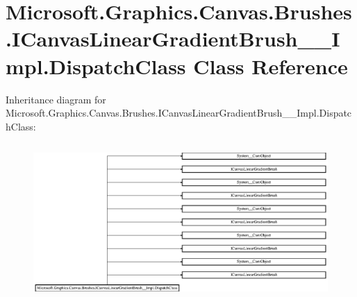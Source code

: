 \hypertarget{class_microsoft_1_1_graphics_1_1_canvas_1_1_brushes_1_1_i_canvas_linear_gradient_brush_____impl_1_1_dispatch_class}{}\section{Microsoft.\+Graphics.\+Canvas.\+Brushes.\+I\+Canvas\+Linear\+Gradient\+Brush\+\_\+\+\_\+\+Impl.\+Dispatch\+Class Class Reference}
\label{class_microsoft_1_1_graphics_1_1_canvas_1_1_brushes_1_1_i_canvas_linear_gradient_brush_____impl_1_1_dispatch_class}
Inheritance diagram for Microsoft.\+Graphics.\+Canvas.\+Brushes.\+I\+Canvas\+Linear\+Gradient\+Brush\+\_\+\+\_\+\+Impl.\+Dispatch\+Class\+:\begin{figure}[H]
\begin{center}
\leavevmode
\includegraphics[height=6.015625cm]{class_microsoft_1_1_graphics_1_1_canvas_1_1_brushes_1_1_i_canvas_linear_gradient_brush_____impl_1_1_dispatch_class}
\end{center}
\end{figure}
